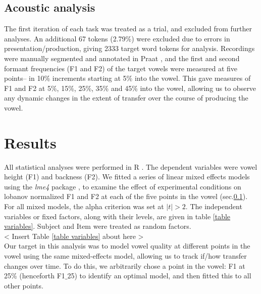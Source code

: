 \documentclass[12 pt]{article}
\newcommand{\nt}[1]{\textipa{[#1]}} %
\begin{document}
\subsection{Acoustic analysis}\label{analysis}
The first iteration of each task was treated as a trial, and excluded from further analyses. An additional 67 tokens (2.79\%) were excluded due to errors in presentation/production, giving 2333 target word tokens for analysis. Recordings were manually segmented and annotated in Praat \citep{boersma2016praat}, and the first and second formant frequencies (F1 and F2) of the target vowels \nt{2, \ae} were measured at five points-- in 10\% increments starting at 5\% into the vowel. This gave measures of F1 and F2 at 5\%, 15\%, 25\%, 35\% and 45\% into the vowel, allowing us to observe any dynamic changes in the extent of transfer over the course of producing the vowel.


\section{Results} \label{results}

All statistical analyses were performed in R \citep{r}. The dependent variables were vowel height (F1) and backness (F2). We fitted a series of linear mixed effects models using the \emph{lme4} package \citep{lme4}, to examine the effect of experimental conditions on lobanov normalized F1 and F2 at each of the five points in the vowel (sec.\ref{analysis}). For all mixed models, the alpha criterion was set at $|t| > 2 $. The independent variables or fixed factors, along with their levels, are given in table \ref{table variables}. Subject and Item were treated as random factors.\\

< Insert Table \ref{table variables} about here > \\

Our target in this analysis was to model vowel quality at different points in the vowel using the same mixed-effects model, allowing us to track if/how transfer changes over time. To do this, we arbitrarily chose a point in the vowel: F1 at 25\% (henceforth F1$\_$25) to identify an optimal model, and then fitted this to all other points. 
\end{document}
